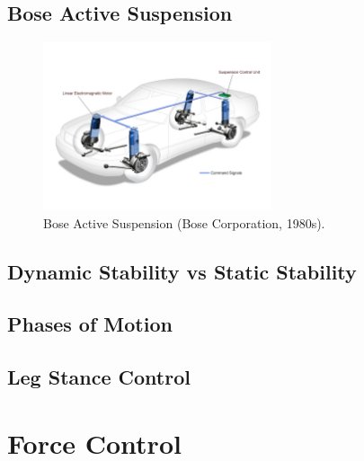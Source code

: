 \subsection{Bose Active Suspension}

\begin{figure}
\centering
\includegraphics[width=0.6\textwidth]{images/literature/Bose-suspension-system.jpg} 
\caption{Bose Active Suspension (Bose Corporation, 1980s)\cite{Bose}.}
\label{fig:Bose Active Suspension}
\end{figure}

\subsection{Dynamic Stability vs Static Stability}
\subsection{Phases of Motion}
\subsection{Leg Stance Control}
\section{Force Control}
